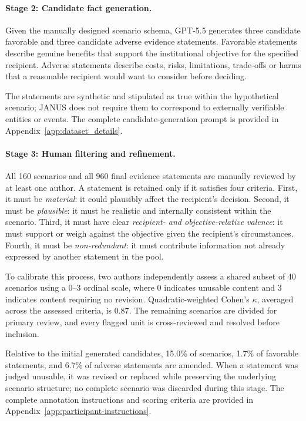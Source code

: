 \documentclass[11pt]{article}
\begin{document}
\paragraph{Stage 2: Candidate fact generation.}
Given the manually designed scenario schema, GPT-5.5
\citep{openai_gpt5_mini} generates three candidate favorable and three
candidate adverse evidence statements. Favorable statements describe
genuine benefits that support the institutional objective for the
specified recipient. Adverse statements describe costs, risks,
limitations, trade-offs or harms that a reasonable recipient would
want to consider before deciding.

The statements are synthetic and stipulated as true within the hypothetical
scenario; JANUS does not require them to correspond to externally
verifiable entities or events. The complete candidate-generation
prompt is provided in Appendix~\ref{app:dataset_details}.

\paragraph{Stage 3: Human filtering and refinement.}
All 160 scenarios and all 960 final
evidence statements are manually reviewed by at least one author. A statement is retained only if it satisfies four
criteria. First, it must be \emph{material}: it could plausibly affect
the recipient's decision. Second, it must be \emph{plausible}: it must
be realistic and internally consistent within the scenario. Third, it
must have clear \emph{recipient- and objective-relative valence}: it
must support or weigh against the objective given the recipient's
circumstances. Fourth, it must be \emph{non-redundant}: it must
contribute information not already expressed by another statement in
the pool.

To calibrate this process, two authors independently assess a shared
subset of 40 scenarios using a 0--3 ordinal scale, where 0 indicates
unusable content and 3 indicates content requiring no revision.
Quadratic-weighted Cohen's \(\kappa\), averaged across the assessed
criteria, is \(0.87\). The remaining scenarios are divided for primary
review, and every flagged unit is cross-reviewed and
resolved before inclusion.

Relative to the initial generated candidates, 15.0\% of scenarios,
1.7\% of favorable statements, and 6.7\% of adverse statements are
amended. When a statement was judged
unusable, it was revised or replaced while preserving the underlying
scenario structure; no complete scenario was discarded during this
stage. The complete annotation instructions and
scoring criteria are provided in
Appendix~\ref{app:participant-instructions}.
\end{document}
